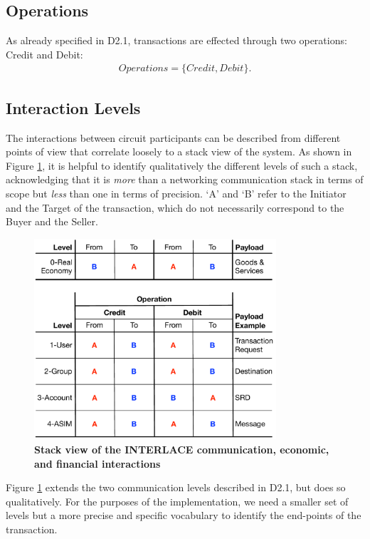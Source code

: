 \subsection{Operations}
As already specified in D2.1, transactions are effected through two operations: Credit and Debit:
\begin{align}
Operations = \{ Credit, Debit \}.
\end{align}

\subsection{Interaction Levels}
The interactions between circuit participants can be described from different points of view that correlate loosely to a stack view of the system. As shown in Figure \ref{fig:stack}, it is helpful to identify qualitatively the different levels of such a stack, acknowledging that it is \emph{more} than a networking communication stack in terms of scope but \emph{less} than one in terms of precision. `A' and `B' refer to the Initiator and the Target of the transaction, which do not necessarily correspond to the Buyer and the Seller.

\begin{figure}[htbp]
\centering
\includegraphics[width=9cm]{Figures/Stack}
\caption{\small\textbf{Stack view of the INTERLACE communication, economic, and financial  interactions}}
\label{fig:stack}
\end{figure}
\vspace{-0.5cm}

Figure \ref{fig:stack} extends the two communication levels described in D2.1, but does so qualitatively. For the purposes of the implementation, we need a smaller set of levels but a more precise and specific vocabulary to identify the end-points of the transaction.

